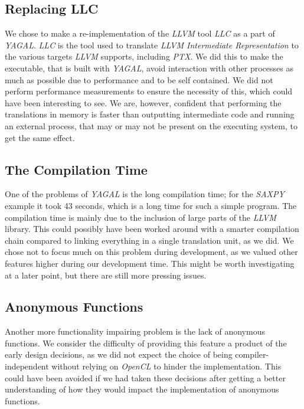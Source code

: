 \subsection*{Replacing LLC}
We chose to make a re-implementation of the \textit{LLVM} tool \textit{LLC} as a part of \textit{YAGAL}. \textit{LLC} is the tool used to translate \textit{LLVM Intermediate Representation} to the various targets \textit{LLVM} supports, including \textit{PTX}. We did this to make the executable, that is built with \textit{YAGAL}, avoid interaction with other processes as much as possible due to performance and to be self contained. We did not perform performance measurements to ensure the necessity of this, which could have been interesting to see. We are, however, confident that performing the translations in memory is faster than outputting intermediate code and running an external process, that may or may not be present on the executing system, to get the same effect.

\subsection*{The Compilation Time}
One of the problems of \textit{YAGAL} is the long compilation time; for the \textit{SAXPY} example it took 43 seconds, which is a long time for such a simple program. The compilation time is mainly due to the inclusion of large parts of the \textit{LLVM} library. This could possibly have been worked around with a smarter compilation chain compared to linking everything in a single translation unit, as we did. We chose not to focus much on this problem during development, as we valued other features higher during our development time. This might be worth investigating at a later point, but there are still more pressing issues.

\subsection*{Anonymous Functions}
Another more functionality impairing problem is the lack of anonymous functions. We consider the difficulty of providing this feature a product of the early design decisions, as we did not expect the choice of being compiler-independent without relying on \textit{OpenCL} to hinder the implementation. This could have been avoided if we had taken these decisions after getting a better understanding of how they would impact the implementation of anonymous functions.


